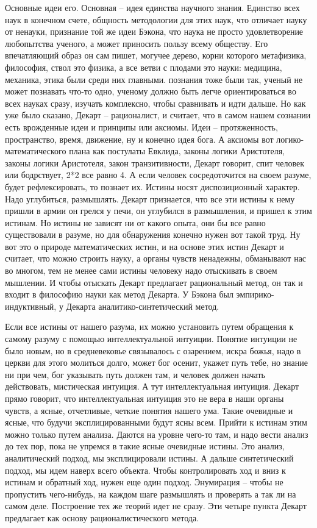 \documentclass[a4paper, 12pt]{article}
\begin{document}
Основные идеи его. Основная -- идея единства научного знания. Единство 
всех наук в конечном счете, общность методологии для этих наук, что 
отличает науку от ненауки, признание той же идеи Бэкона, что наука не 
просто удовлетворение любопытства ученого, а может приносить пользу 
всему обществу. Его впечатляющий образ он сам пишет, могучее дерево, 
корни которого метафизика, философия, ствол это физика, а все ветви 
с плодами это науки: медицина, механика, этика были среди них главными. 
познания тоже были так, ученый не может познавать что-то одно, ученому 
должно быть легче ориентироваться во всех науках сразу, изучать 
комплексно, чтобы сравнивать и идти дальше. Но как уже было сказано, 
Декарт -- рационалист, и считает, что в самом нашем сознании есть 
врожденные идеи и принципы или аксиомы. Идеи -- протяженность, 
пространство, время, движение, ну и конечно идея бога. А аксиомы вот 
логико-математического плана как постулаты Евклида, законы логики 
Аристотеля, законы логики Аристотеля, закон транзитивности, Декарт 
говорит, спит человек или бодрствует, 2*2 все равно 4. А если человек 
сосредоточится на своем разуме, будет рефлексировать, то познает их. 
Истины носят диспозиционный характер. Надо углубиться, размышлять. 
Декарт признается, что все эти истины к нему пришли в армии он грелся 
у печи, он углубился в размышления, и пришел к этим истинам. Но истины 
не зависят ни от какого опыта, они бы все равно существовали в разуме, 
но для обнаружения конечно нужен вот такой труд. Ну вот это о природе 
математических истин, и на основе этих истин Декарт и считает, что можно 
строить науку, а органы чувств ненадежны, обманывают нас во многом, тем 
не менее сами истины человеку надо отыскивать в своем мышлении. И чтобы 
отыскать Декарт предлагает рациональный метод, он так и входит 
в философию науки как метод Декарта. У Бэкона был эмпирико-индуктивный, 
у Декарта аналитико-синтетический метод.

Если все истины от нашего разума, их можно установить путем обращения 
к самому разуму с помощью интеллектуальной интуиции. Понятие интуиции не 
было новым, но в средневековье связывалось с озарением, искра божья, 
надо в церкви для этого молиться долго, может бог осенит, укажет путь 
тебе, но знание ни при чем, бог указывать путь должен там, и человек 
должен начать действовать, мистическая интуиция. А тут интеллектуальная 
интуиция. Декарт прямо говорит, что интеллектуальная интуиция это не 
вера в наши органы чувств, а ясные, отчетливые, четкие понятия нашего 
ума. Такие очевидные и ясные, что будучи эксплицированными будут ясны 
всем. Прийти к истинам этим можно только путем анализа. Даются на уровне 
чего-то там, и надо вести анализ до тех пор, пока не упремся в такие 
ясные очевидные истины. Это анализ, аналитический подход, мы 
эксплицировали истины. А дальше синтетический подход, мы идем наверх 
всего объекта. Чтобы контролировать ход и вниз к истинам и обратный ход, 
нужен еще один подход. Энумирация -- чтобы не пропустить чего-нибудь, на 
каждом шаге размышлять и проверять а так ли на самом деле. Построение 
тех же теорий идет не сразу. Эти четыре пункта Декарт предлагает как 
основу рационалистического метода.
\end{document}
